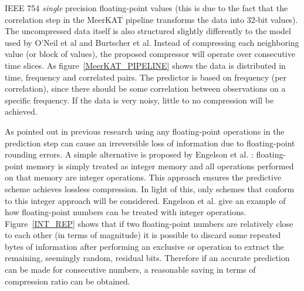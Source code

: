 IEEE 754 \textit{single} precision floating-point values (this is due to the fact that the correlation step in the MeerKAT pipeline transforms the data into 32-bit values). 
The uncompressed data itself is also structured slightly differently to the model used by O'Neil et al and Burtscher et al. Instead of compressing each neighboring value (or 
block of values), the proposed compressor will operate over consecutive time slices. As figure~\ref{MeerKAT_PIPELINE} shows the data is distributed in time, frequency and correlated pairs. 
The predictor is based on frequency (per correlation), since there should be some correlation between observations on a specific frequency. If the data is very noisy, little to no 
compression will be achieved. 

As pointed out in previous research \cite{engelson2000lossless,lindstrom2006fast} using any floating-point operations in the prediction step can cause an irreversible loss of information due to floating-point
rounding errors. A simple alternative is proposed by Engelson et al. \cite{engelson2000lossless}: floating-point memory is simply treated as integer memory and all operations performed on that memory 
are integer operations. This approach ensures the predictive scheme achieves lossless compression. In light of this, only schemes that conform to this integer approach will be considered. Engelson et al. give an example 
of how floating-point numbers can be treated with integer operations. Figure~\ref{INT_REP} shows that if two floating-point numbers are relatively close to each other (in terms of magnitude) it is possible to discard 
some repeated bytes of information after performing an exclusive or operation to extract the remaining, seemingly random, residual bits. Therefore if an accurate prediction can be made for consecutive numbers, a 
reasonable saving in terms of compression ratio can be obtained.

